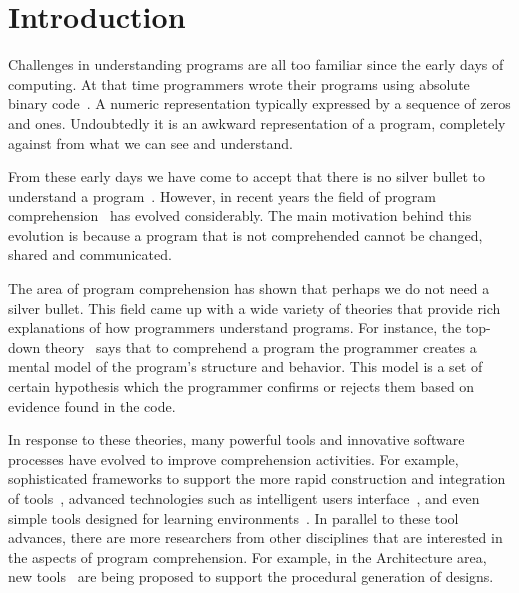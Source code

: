 
% 
% 

\section{Introduction}

Challenges in understanding programs are all too familiar since the early days of computing. At that time programmers wrote their programs using absolute binary code~\cite{hamming2003art}. A numeric representation typically expressed by a sequence of zeros and ones. Undoubtedly it is an awkward representation of a program, completely against from what we can see and understand.

From these early days we have come to accept that there is no silver bullet to understand a program~\cite{bullet1987essence}. However, in recent years the field of program comprehension~\cite{rugaber1995program} has evolved considerably. The main motivation behind this evolution is because a program that is not comprehended cannot be changed, shared and communicated. 

The area of program comprehension has shown that perhaps we do not need a silver bullet. This field came up with a wide variety of theories that provide rich explanations of how programmers understand programs. For instance, the top-down theory~\cite{brooks1977towards} says that to comprehend a program the programmer creates a mental model of the program's structure and behavior. This model is a set of certain hypothesis which the programmer confirms or rejects them based on evidence found in the code.

In response to these theories, many powerful tools and innovative software processes have evolved to improve comprehension activities. For example, sophisticated frameworks to support the more rapid construction and integration of tools~\cite{DesRivieres2004}, advanced technologies such as intelligent users interface~\cite{carlson2005eclipse,boudreau2002netbeans,intellij2001intellij,guckenheimer2006software}, and even simple tools designed for learning environments~\cite{papert1980mindstorms,Kay1993,Reas2006,findler2002drscheme,GuoSIGCSE2013,mcdirmid2013usable}. In parallel to these tool advances, there are more researchers from other disciplines that are interested in the aspects of program comprehension. For example, in the Architecture area, new tools~\cite{aish2012designscript,lopes2011portable} are being proposed to support the procedural generation of designs.

